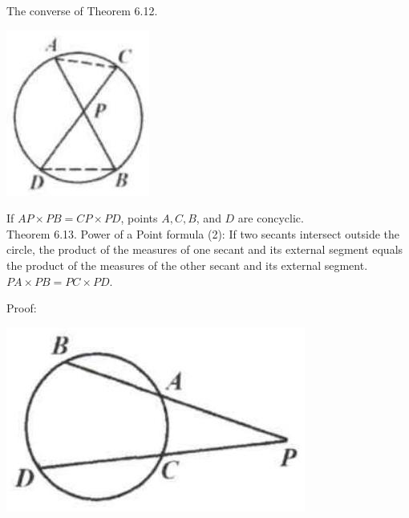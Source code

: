 \documentclass[10pt]{article}
\begin{document}
The converse of Theorem 6.12.
\begin{center}
\includegraphics[max width=\textwidth]{2025_04_17_97bc1f7e44d93c271a88g-192(1)}
\end{center}

If \(A P \times P B=C P \times P D\), points \(A, C, B\), and \(D\) are concyclic.\\
Theorem 6.13. Power of a Point formula (2): If two secants intersect outside the circle, the product of the measures of one secant and its external segment equals the product of the measures of the other secant and its external segment.\\
\(P A \times P B=P C \times P D\).

Proof:
\begin{center}
\includegraphics[max width=\textwidth]{2025_04_17_97bc1f7e44d93c271a88g-192(3)}
\end{center}
\end{document}
